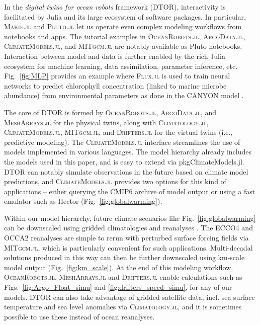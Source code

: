 \documentclass{juliacon}[12pt]
\newcommand{\pkg}[1]{{\small \textsc{#1}}}
\begin{document}
In the {\it digital twins for ocean robots} framework (DTOR), interactivity is facilitated by Julia and its large ecosystem of software packages. In particular, \pkg{Makie.jl} \cite{Makie} and \pkg{Pluto.jl} \cite{Pluto} let us operate even complex modeling workflows from notebooks and apps. The tutorial examples in \pkg{OceanRobots.jl}, \pkg{ArgoData.jl}, \pkg{ClimateModels.jl}, and \pkg{MITgcm.jl} \cite{Forget2024b} are notably available as Pluto notebooks. Interaction between model and data is further enabled by the rich Julia ecosystem for machine learning, data assimilation, parameter inference, etc. Fig.~\ref{fig:MLP} provides an example where \pkg{Flux.jl} \cite{Innes2018} is used to train neural networks to predict chlorophyll concentration (linked to marine microbe abundance) from environmental parameters as done in the CANYON model \cite{Sauzede2017,Bittig2018}.

The core of DTOR is formed by \pkg{OceanRobots.jl}, \pkg{ArgoData.jl}, and \pkg{MeshArrays.jl} for the physical twins, along with \pkg{Climatology.jl}, \pkg{ClimateModels.jl}, \pkg{MITgcm.jl}, and \pkg{Drifters.jl} for the virtual twins (i.e., predictive modeling). The \pkg{ClimateModels.jl} interface streamlines the use of models implemented in various languages. The model hierarchy already includes the models used in this paper, and is easy to extend via pkg{ClimateModels.jl}. DTOR can notably simulate observations in the future based on climate model predictions, and \pkg{ClimateModels.jl} provides two options for this kind of applications -- either querying the CMIP6 archive of model output \cite{CMIP6} or using a fast emulator such as Hector \cite{Hector2015} (Fig.~\ref{fig:globalwarming}). 

Within our model hierarchy, future climate scenarios like Fig.~\ref{fig:globalwarming} can be downscaled using gridded climatologies and reanalyses \cite{Forget2010,Forget2015a,Forget2024a}. The ECCO4 and OCCA2 reanalyses are simple to rerun with perturbed surface forcing fields via \pkg{MITgcm.jl}, which is particularly convenient for such applications. Multi-decadal solutions produced in this way can then be further downscaled using km-scale model output (Fig.~\ref{fig:km_scale}). At the end of this modeling workflow, \pkg{OceanRobots.jl}, \pkg{MeshArrays.jl} and \pkg{Drifters.jl} enable calculations such as Figs.~\ref{fig:Argo_Float_simu} and \ref{fig:drifters_speed_simu}, for any of our models. DTOR can also take advantage of gridded satellite data, incl. sea surface temperature and sea level anomalies via \pkg{Climatology.jl}, and it is sometimes possible to use these instead of ocean reanalyses.
\end{document}
